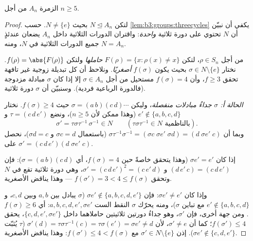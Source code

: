 \begin{theorem}\label{thm:b3:groups:ansimple}
الزمرة $A_n$  من أجل $n \geq 5$.
\end{theorem}

\begin{proof}
لتكن $N \trianglelefteq A_n$ بحيث $N \neq \{e\}$. حسب \cref{lem:b3:groups:threecycles} يكفي أن نبيّن
أن $N$ تحتوي على دورة ثلاثية \emph{واحدة}:  واقتران
الدورات الثلاثية داخل $A_n$ يضعان عندئذٍ جميع الدورات الثلاثية في
$N$، ومنه $N = A_n$.

من أجل $\rho \in S_n$، لتكن $F(\rho) = \{x : \rho(x) \neq x\}$ \emph{حاملها} ولتكن $f(\rho) = \abs{F(\rho)}$.
نختار $\sigma \in N
\setminus \{e\}$ بحيث يكون $f(\sigma)$ \emph{أصغريًا}. ونلاحظ أن كل
تبديلة زوجية غير تافهة تحقق $f \geq 3$، وأن $f(\sigma) =
4$ مستحيل من
أجل $\sigma \in A_n$ إلا إذا كان $\sigma$ مبادلة مزدوجة (فالدورة
الرباعية فردية). وسنبيّن أن $\sigma$ دورة ثلاثية.

\emph{الحالة أ: $\sigma$ جداءُ مبادلات منفصلة}، وليكن $\sigma = (a\,b)(c\,d)\cdots$
حيث $f(\sigma) \geq 4$. نختار $e'
\notin \{a, b, c, d\}$ (وهذا ممكن لأن $n \geq 5$)، ونضع
$\tau =
(c\,d\,e')$ و
\[
\sigma' = \tau\sigma\tau^{-1}\,\sigma^{-1} \in N
\qquad (\tau\sigma\tau^{-1} \in N \text{ بالناظمية}).
\]
وبما أن $\sigma\tau^{-1}\sigma^{-1} = (\sigma c\;\sigma e'\;\sigma
d) = (d\;\sigma e'\;c)$ (باستعمال $\sigma c = d$ و $\sigma d = c$)، نحصل
على $\sigma' = (c\,d\,e')(d\;\sigma e'\;c)$.

إذا كان $\sigma e' = e'$ (وهذا يتحقق خاصةً حين $f(\sigma) =
4$، أي
$\sigma = (a\,b)(c\,d)$): فإن $(d\,e'\,c) =
(c\,d\,e')$ و $\sigma' = (c\,d\,e')^2 = (c\,e'\,d)$، وهي دورة ثلاثية تقع في $N$
وتحقق $f(\sigma') = 3 < 4 \leq f(\sigma)$ --- وهذا يناقض الأصغرية.

وإذا كان $\sigma e' \neq e'$: فإن $\sigma e' \notin \{a, b, c, d,
e'\}$ ($\sigma$ يبادل بين $a,b$ وبين
$c,d$، و $e' \notin \{a,b,c,d\}$ مع تباين $\sigma$)، ومنه يحرّك $\sigma$ النقط
الست $a, b,
c, d, e', \sigma e'$: أي $f(\sigma) \geq 6$. ومن جهة أخرى، فإن $\sigma'$، وهو
جداءُ دورتين ثلاثيتين حاملاهما داخل $\{c, d,
e', \sigma e'\}$، يحقق $f(\sigma') \leq 4$؛
كما أن $\sigma' \neq
e$، لأن $\sigma'(d) = \tau\sigma\tau^{-1}(c) = \tau\sigma(e') =
\sigma e' \neq d$ ($\tau$ يُثبّت $\sigma e' \notin \{c,d,e'\}$). إذن
$\sigma' \in N \setminus\{e\}$ مع $f(\sigma') \leq 4 <
f(\sigma)$: وهذا يناقض الأصغرية.


\end{proof}
